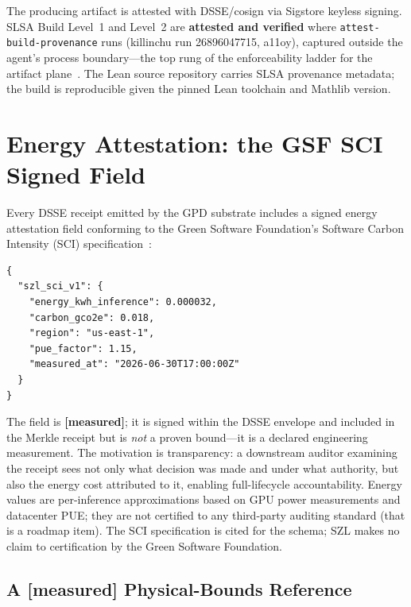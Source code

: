 \documentclass[11pt,letterpaper]{article}
\theoremstyle{definition}
\newcommand{\measured}{\textbf{[measured]}}
\begin{document}
The producing artifact is attested with DSSE/cosign via Sigstore keyless signing.
SLSA Build Level~1 and Level~2 are \textbf{attested and verified} where
\texttt{attest-build-provenance} runs (killinchu run 26896047715, a11oy),
captured outside the agent's process boundary---the top rung of the enforceability
ladder for the artifact plane~\cite{armo2025}.  The Lean source repository carries
SLSA provenance metadata; the build is reproducible given the pinned Lean toolchain
and Mathlib version.

\section{Energy Attestation: the GSF SCI Signed Field}
\label{sec:energy}

Every DSSE receipt emitted by the GPD substrate includes a signed energy
attestation field conforming to the Green Software Foundation's Software Carbon
Intensity (SCI) specification~\cite{gsf_sci}:
\begin{lstlisting}
{
  "szl_sci_v1": {
    "energy_kwh_inference": 0.000032,
    "carbon_gco2e": 0.018,
    "region": "us-east-1",
    "pue_factor": 1.15,
    "measured_at": "2026-06-30T17:00:00Z"
  }
}
\end{lstlisting}
The field is \measured{}; it is signed within the DSSE envelope and included
in the Merkle receipt but is \emph{not} a proven bound---it is a declared
engineering measurement.  The motivation is transparency: a downstream auditor
examining the receipt sees not only what decision was made and under what
authority, but also the energy cost attributed to it, enabling full-lifecycle
accountability.  Energy values are per-inference approximations based on GPU
power measurements and datacenter PUE; they are not certified to any
third-party auditing standard (that is a roadmap item).  The SCI specification
is cited for the schema; SZL makes no claim to certification by the Green
Software Foundation.

\subsection{A \measured{} Physical-Bounds Reference}
\label{sec:energy-measured}
\end{document}
